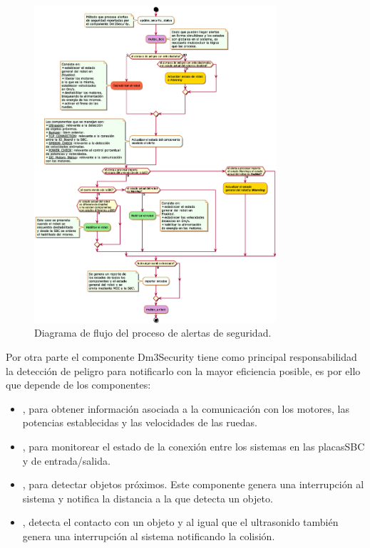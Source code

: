 \documentclass[withindex,glossary]{cam-thesis}
\begin{document}
\begin{figure}[H]
\centering
\label{fig: Diagrama_de_flujo_proceso_alertas_de_seguridad}
\includegraphics[width=0.8\textwidth]{images/Diagrama_de_flujo_Dm3Security_update_status}
\caption[Diagrama de flujo del proceso de alertas de seguridad]{Diagrama de flujo del proceso de alertas de seguridad.}
\end{figure}

Por otra parte el componente Dm3Security tiene como principal responsabilidad la detección de peligro para notificarlo con la mayor eficiencia posible, es por ello que depende de los componentes:
\begin{itemize}
\item  {}, para obtener información asociada a la comunicación con los motores, las potencias establecidas y las velocidades de las ruedas.
\item  {}, para monitorear el estado de la conexión entre los sistemas en las placas\gls{SBC} y de entrada/salida.
\item  {}, para detectar objetos próximos. Este componente genera una interrupción al sistema y notifica la distancia a la que detecta un objeto.
\item  {}, detecta el contacto con un objeto y al igual que el ultrasonido también genera una interrupción al sistema notificando la colisión.
\end{itemize}
\end{document}
